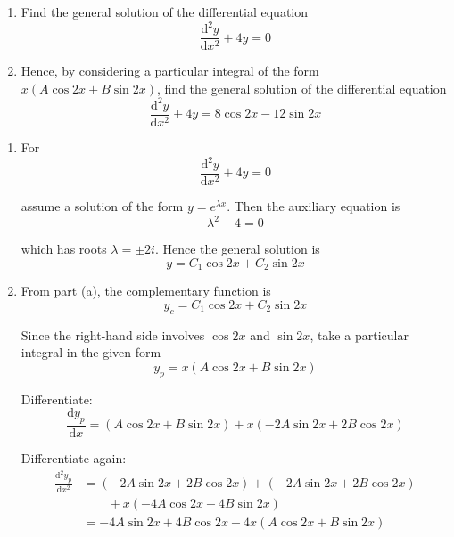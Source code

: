 \documentclass[leqno]{article}
\begin{document}
\djsFrontMatter
\begin{enumerate}[
  label=\textbf{\arabic*.},
  leftmargin=*,
  topsep=0pt,
  partopsep=0pt,
  parsep=0pt
]

\questionitem

\begin{enumerate}[label=\textbf{(\alph*)}]
  \item Find the general solution of the differential equation
  \[
  \frac{\mathrm{d}^2 y}{\mathrm{d}x^2}+4y=0
  \]
  \item Hence, by considering a particular integral of the form $x(A\cos 2x+B\sin 2x)$, find the general solution of the differential equation
  \[
  \frac{\mathrm{d}^2 y}{\mathrm{d}x^2}+4y=8\cos 2x-12\sin 2x
  \]
\end{enumerate}

\vspace*{10pt}

\begin{djsSolution}
\begin{enumerate}[label=\textbf{(\alph*)}]
  \item For
  \[
  \frac{\mathrm{d}^2 y}{\mathrm{d}x^2}+4y=0
  \]

  assume a solution of the form $y=e^{\lambda x}$. Then the auxiliary equation is
  \[
  \lambda^2+4=0
  \]

  which has roots $\lambda=\pm 2i$. Hence the general solution is
  \[
  y=C_1\cos 2x+C_2\sin 2x
  \]

  \item From part (a), the complementary function is
  \[
  y_c=C_1\cos 2x+C_2\sin 2x
  \]

  Since the right-hand side involves $\cos 2x$ and $\sin 2x$, take a particular integral in the given form
  \[
  y_p=x(A\cos 2x+B\sin 2x)
  \]

  Differentiate:
  \[
  \frac{\mathrm{d}y_p}{\mathrm{d}x}
  = (A\cos 2x+B\sin 2x)+x(-2A\sin 2x+2B\cos 2x)
  \]

  Differentiate again:
  \begin{align*}
  \frac{\mathrm{d}^2 y_p}{\mathrm{d}x^2}
  &= (-2A\sin 2x+2B\cos 2x)+(-2A\sin 2x+2B\cos 2x) \\
  &\qquad {} + x(-4A\cos 2x-4B\sin 2x) \\
  &= -4A\sin 2x+4B\cos 2x-4x(A\cos 2x+B\sin 2x)
  \end{align*}


\end{enumerate}
\end{djsSolution}
\end{enumerate}
\end{document}
